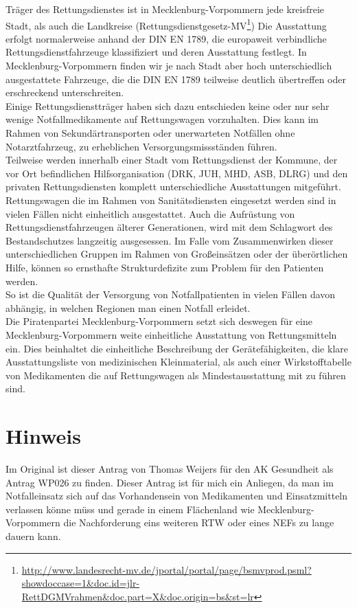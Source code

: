 Träger des Rettungsdienstes ist in Mecklenburg-Vorpommern jede kreisfreie Stadt, als auch die Landkreise (Rettungsdienstgesetz-MV\footnote{\url{http://www.landesrecht-mv.de/jportal/portal/page/bsmvprod.psml?showdoccase=1\&doc.id=jlr-RettDGMVrahmen\&doc.part=X\&doc.origin=bs\&st=lr}}) Die Ausstattung erfolgt normalerweise anhand der DIN EN 1789, die europaweit verbindliche Rettungsdienstfahrzeuge klassifiziert und deren Ausstattung festlegt. In Mecklenburg-Vorpommern finden wir je nach Stadt aber hoch unterschiedlich ausgestattete Fahrzeuge, die die DIN EN 1789 teilweise deutlich übertreffen oder erschreckend unterschreiten.\\Einige Rettungsdienstträger haben sich dazu entschieden keine oder nur sehr wenige Notfallmedikamente auf Rettungswagen vorzuhalten. Dies kann im Rahmen von Sekundärtransporten oder unerwarteten Notfällen ohne Notarztfahrzeug, zu erheblichen Versorgungsmissständen führen.\\Teilweise werden innerhalb einer Stadt vom Rettungsdienst der Kommune, der vor Ort befindlichen Hilfsorganisation (DRK, JUH, MHD, ASB, DLRG) und den privaten Rettungsdiensten komplett unterschiedliche Ausstattungen mitgeführt. Rettungswagen die im Rahmen von Sanitätsdiensten eingesetzt werden sind in vielen Fällen nicht einheitlich ausgestattet. Auch die Aufrüstung von Rettungsdienstfahrzeugen älterer Generationen, wird mit dem Schlagwort des Bestandschutzes langzeitig ausgesessen. Im Falle vom Zusammenwirken dieser unterschiedlichen Gruppen im Rahmen von Großeinsätzen oder der überörtlichen Hilfe, können so ernsthafte Strukturdefizite zum Problem für den Patienten werden.\\So ist die Qualität der Versorgung von Notfallpatienten in vielen Fällen davon abhängig, in welchen Regionen man einen Notfall erleidet.\\Die Piratenpartei Mecklenburg-Vorpommern setzt sich deswegen für eine Mecklenburg-Vorpommern weite einheitliche Ausstattung von Rettungsmitteln ein. Dies beinhaltet die einheitliche Beschreibung der Gerätefähigkeiten, die klare Ausstattungsliste von medizinischen Kleinmaterial, als auch einer Wirkstofftabelle von Medikamenten die auf Rettungswagen als Mindestausstattung mit zu führen sind.

\section{Hinweis}

Im Original ist dieser Antrag von Thomas Weijers für den AK Gesundheit als Antrag WP026 zu finden. Dieser Antrag ist für mich ein Anliegen, da man im Notfalleinsatz sich auf das Vorhandensein von Medikamenten und Einsatzmitteln verlassen könne müss und gerade in einem Flächenland wie Mecklenburg-Vorpommern die Nachforderung eins weiteren RTW oder eines NEFs zu lange dauern kann.
